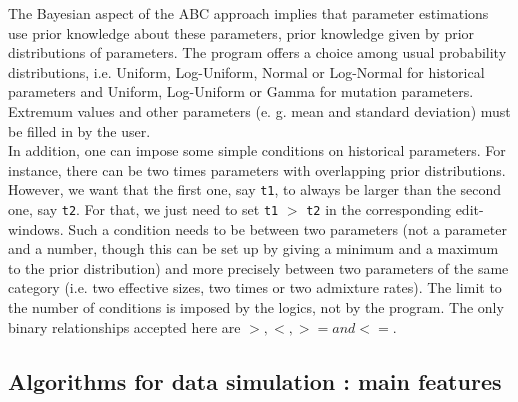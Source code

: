 The Bayesian aspect of the ABC approach implies that parameter estimations
use prior knowledge about these parameters, prior knowledge given
by prior distributions of parameters. The program offers a choice
among usual probability distributions, i.e. Uniform, Log-Uniform,
Normal or Log-Normal for historical parameters and Uniform, Log-Uniform
or Gamma for mutation parameters. Extremum values and other parameters
(e. g. mean and standard deviation) must be filled in by the user.
\\
 In addition, one can impose some simple conditions on historical
parameters. For instance, there can be two times parameters with overlapping
prior distributions. However, we want that the first one, say \texttt{t1},
to always be larger than the second one, say \texttt{t2}. For that,
we just need to set \texttt{t1} $>$ \texttt{t2} in the corresponding
edit-windows. Such a condition needs to be between two parameters
(not a parameter and a number, though this can be set up by giving
a minimum and a maximum to the prior distribution) and more precisely
between two parameters of the same category (i.e. two effective sizes,
two times or two admixture rates). The limit to the number of conditions
is imposed by the logics, not by the program. The only binary relationships
accepted here are $>,<,>=and<=$.


\subsection{Algorithms for data simulation : main features}

